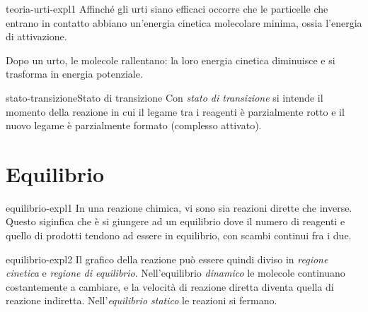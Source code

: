 \documentclass[preview]{standalone}
\begin{document}

\begin{snippet}{teoria-urti-expl1}
    Affinché gli urti siano efficaci occorre che le particelle che
entrano in contatto abbiano un'energia cinetica molecolare
minima, ossia l'energia di attivazione.

Dopo un urto, le molecole rallentano: la loro energia
cinetica diminuisce e si trasforma in energia potenziale.
\end{snippet}

\begin{snippetdefinition}{stato-transizione}{Stato di transizione}
    Con \textit{stato di transizione} si intende
    il momento della reazione in cui il
    legame tra i reagenti è parzialmente rotto e il nuovo
    legame è parzialmente formato (complesso attivato).
\end{snippetdefinition}



\section{Equilibrio}

\begin{snippet}{equilibrio-expl1}
    In una reazione chimica, vi sono sia reazioni dirette che inverse.
Questo siginfica che è si giungere ad un equilibrio dove
il numero di reagenti e quello di prodotti tendono ad essere in equilibrio,
con scambi continui fra i due.
\end{snippet}


\begin{snippet}{equilibrio-expl2}
    Il grafico della reazione può essere quindi diviso in \textit{regione cinetica}
e \textit{regione di equilibrio}. 
Nell'equilibrio \textit{dinamico} le molecole continuano costantemente a
cambiare, e la velocità di reazione diretta diventa quella di reazione indiretta.
Nell'\textit{equilibrio statico} le reazioni si fermano.
\end{snippet}

\end{document}
